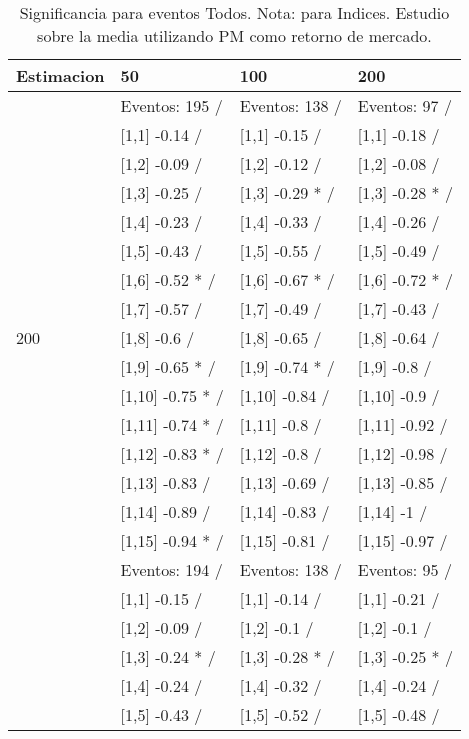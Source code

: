 \begin{table}

\caption{Significancia para eventos Todos. Nota: para Indices. Estudio sobre la media utilizando PM como retorno de mercado.}
\centering
\begin{tabular}[t]{llll}
\toprule
Estimacion & 50 & 100 & 200\\
\midrule
 & Eventos:  195 / & Eventos:  138 / & Eventos:  97 /\\
 & {}[1,1] -0.14  / & {}[1,1] -0.15  / & {}[1,1] -0.18  /\\
 & {}[1,2] -0.09  / & {}[1,2] -0.12  / & {}[1,2] -0.08  /\\
 & {}[1,3] -0.25  / & {}[1,3] -0.29 * / & {}[1,3] -0.28 * /\\
 & {}[1,4] -0.23  / & {}[1,4] -0.33  / & {}[1,4] -0.26  /\\
\addlinespace
 & {}[1,5] -0.43  / & {}[1,5] -0.55  / & {}[1,5] -0.49  /\\
 & {}[1,6] -0.52 * / & {}[1,6] -0.67 * / & {}[1,6] -0.72 * /\\
 & {}[1,7] -0.57  / & {}[1,7] -0.49  / & {}[1,7] -0.43  /\\
200 & {}[1,8] -0.6  / & {}[1,8] -0.65  / & {}[1,8] -0.64  /\\
 & {}[1,9] -0.65 * / & {}[1,9] -0.74 * / & {}[1,9] -0.8  /\\
\addlinespace
 & {}[1,10] -0.75 * / & {}[1,10] -0.84  / & {}[1,10] -0.9  /\\
 & {}[1,11] -0.74 * / & {}[1,11] -0.8  / & {}[1,11] -0.92  /\\
 & {}[1,12] -0.83 * / & {}[1,12] -0.8  / & {}[1,12] -0.98  /\\
 & {}[1,13] -0.83  / & {}[1,13] -0.69  / & {}[1,13] -0.85  /\\
 & {}[1,14] -0.89  / & {}[1,14] -0.83  / & {}[1,14] -1  /\\
\addlinespace
 & {}[1,15] -0.94 * / & {}[1,15] -0.81  / & {}[1,15] -0.97  /\\
 & Eventos:  194 / & Eventos:  138 / & Eventos:  95 /\\
 & {}[1,1] -0.15  / & {}[1,1] -0.14  / & {}[1,1] -0.21  /\\
 & {}[1,2] -0.09  / & {}[1,2] -0.1  / & {}[1,2] -0.1  /\\
 & {}[1,3] -0.24 * / & {}[1,3] -0.28 * / & {}[1,3] -0.25 * /\\
\addlinespace
 & {}[1,4] -0.24  / & {}[1,4] -0.32  / & {}[1,4] -0.24  /\\
 & {}[1,5] -0.43  / & {}[1,5] -0.52  / & {}[1,5] -0.48  /\\

\end{tabular}
\end{table}
